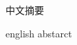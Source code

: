 \begin{cabstract}
    中文摘要
\end{cabstract}

\begin{eabstract}
    english abstarct
\end{eabstract}

